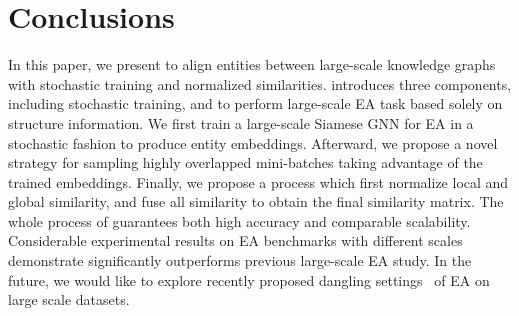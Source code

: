 
\vspace{-2mm}
\section{Conclusions}
\label{sec:conclusions}

In this paper, we present \ClusterEA{} to align entities between large-scale knowledge graphs with stochastic training and normalized similarities.
\ClusterEA{} introduces three components, including stochastic training, \Sampling{} and \Merging{} to perform large-scale EA task based solely on structure information.
We first train a large-scale Siamese GNN for EA in a stochastic fashion to produce entity embeddings. Afterward, we propose a novel \Sampling{} strategy for sampling highly overlapped mini-batches taking advantage of the trained embeddings. Finally, we propose a \Merging{} process which first normalize local and global similarity, and fuse all similarity to obtain the final similarity matrix. The whole process of \ClusterEA{} guarantees both high accuracy and comparable scalability. 
Considerable experimental results on EA benchmarks with different scales demonstrate \ClusterEA{} significantly outperforms previous large-scale EA study.
In the future, we would like to explore recently proposed dangling settings~\cite{NoMatch21} of EA on large scale datasets.